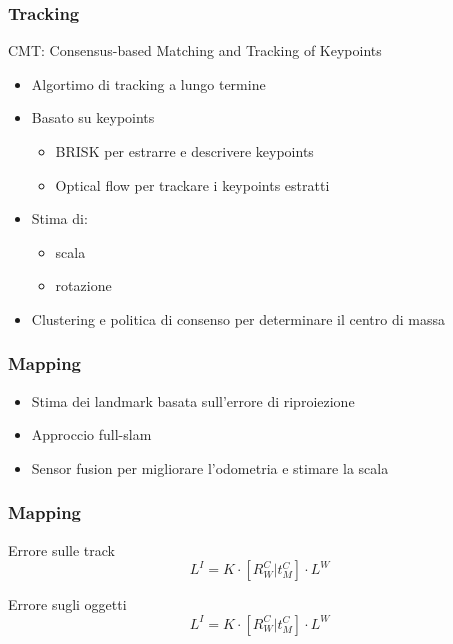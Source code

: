 \documentclass[c]{beamer}
\begin{document}
\begin{frame}
\frametitle{Tracking}

CMT: Consensus-based Matching and Tracking of Keypoints
\begin{itemize}
 \item Algortimo di tracking a lungo termine
 \item Basato su keypoints
 \begin{itemize}
  \item BRISK per estrarre e descrivere keypoints
  \item Optical flow per trackare i keypoints estratti
 \end{itemize}
 \item Stima di:
  \begin{itemize}
  \item scala
  \item rotazione
 \end{itemize}
 \item Clustering e politica di consenso per determinare il centro di massa

\end{itemize}

\end{frame}


\begin{frame}
\frametitle{Mapping}

\begin{itemize}
 \item Stima dei landmark basata sull'errore di riproiezione
 \item Approccio full-slam
 \item Sensor fusion per migliorare l'odometria e stimare la scala
\end{itemize}


\end{frame}


\begin{frame}
\frametitle{Mapping}

\begin{block}{Errore sulle track}
 \begin{equation*}
  L^I =  K\cdot \left[  R^C_W | t^C_M  \right] \cdot L^W
 \end{equation*}
\end{block}

\begin{block}{Errore sugli oggetti}
 \begin{equation*}
  L^I =  K\cdot \left[  R^C_W | t^C_M  \right] \cdot L^W
 \end{equation*}
\end{block}



\end{frame}
\end{document}
